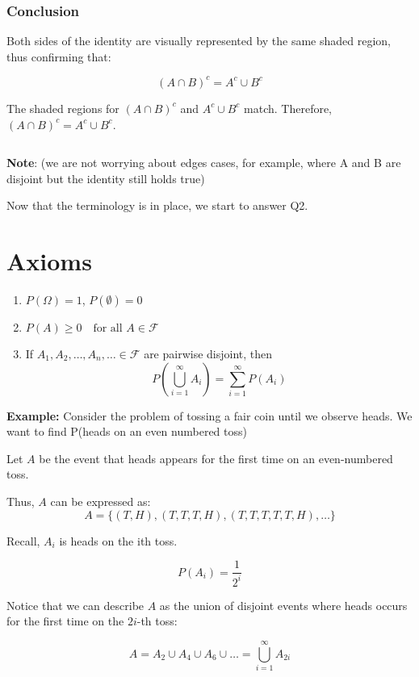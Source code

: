 \documentclass{article}
\begin{document}
\pagebreak

\subsubsection*{Conclusion}

Both sides of the identity are visually represented by the same shaded region, thus confirming that:

\[
(A \cap B)^c = A^c \cup B^c
\]


The shaded regions for \((A \cap B)^c\) and \(A^c \cup B^c\) match. Therefore, \((A \cap B)^c = A^c \cup B^c\). 

\[\]

\textbf{Note}: (we are not worrying about edges cases, for example, where A and B are disjoint but the identity still holds true)

\[\]
Now that the terminology is in place, we start to answer Q2.

\section*{Axioms}

\begin{enumerate}
    \item \(P(\Omega) = 1\), \(P(\emptyset) = 0\)
    \item \(P(A) \geq 0 \quad \text{for all } A \in \mathcal{F}\)
    \item If \(A_1, A_2, \ldots, A_n, \ldots \in \mathcal{F}\) are pairwise disjoint, then 
    \[
    P\left(\bigcup_{i=1}^{\infty} A_i\right) = \sum_{i=1}^{\infty} P(A_i)
    \]
\end{enumerate}


\textbf{Example:}
Consider the problem of tossing a fair coin until we observe heads. We want to find P(heads on an even numbered toss)

Let \( A \) be the event that heads appears for the first time on an even-numbered toss.

Thus, \( A \) can be expressed as:
\[
A = \{ (T, H), (T, T, T, H), (T, T, T, T, T, H), \dots \}
\]

Recall, $A_i$ is heads on the ith toss.


\[
P(A_i) = \frac{1}{2^i}
\]


Notice that we can describe \( A \) as the union of disjoint events where heads occurs for the first time on the \( 2i \)-th toss:

\[
A = A_2 \cup A_4 \cup A_6 \cup \dots = \bigcup_{i=1}^{\infty} A_{2i}
\]
\end{document}
